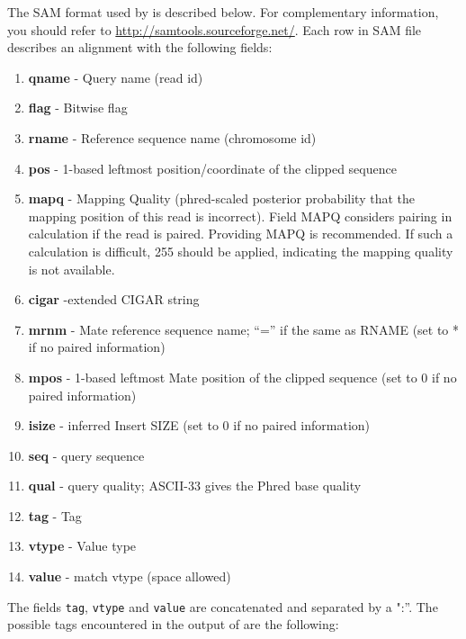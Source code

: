 \documentclass{article}
\begin{document}
The SAM format used by \PALMapper{} is described below. For
complementary information, you should refer to
\url{http://samtools.sourceforge.net/}. Each row in SAM file describes
an alignment with the following fields:
\begin{enumerate}
\item \textbf{qname} - Query name (read id)
\item \textbf{flag} - Bitwise flag
\item \textbf{rname} - Reference sequence name (chromosome id) 
\item \textbf{pos} - 1-based leftmost position/coordinate of the
  clipped sequence 
\item \textbf{mapq} - Mapping Quality (phred-scaled posterior probability that the mapping
position of this read is incorrect). Field MAPQ considers pairing in
calculation if the read is paired. Providing MAPQ is recommended. If
such a calculation is difficult, 255 should be applied, indicating the
mapping quality is not available.
\item \textbf{cigar} -extended CIGAR string 
\item \textbf{mrnm} - Mate reference sequence name; “=” if the same as
  RNAME (set to * if no paired information)
\item \textbf{mpos} - 1-based leftmost Mate position of the clipped
  sequence (set to 0 if no paired information)
\item \textbf{isize} - inferred Insert SIZE (set to 0 if no paired information)
\item \textbf{seq} - query sequence
\item \textbf{qual} - query quality; ASCII-33 gives the Phred base quality
\item \textbf{tag} - Tag
\item \textbf{vtype} - Value type
\item \textbf{value} - match vtype (space allowed) 
\end{enumerate}

The fields \texttt{tag}, \texttt{vtype} and \texttt{value} are
concatenated and separated by a ":''. The possible tags
encountered in the output of \PALMapper{} are the following:\\
\end{document}
